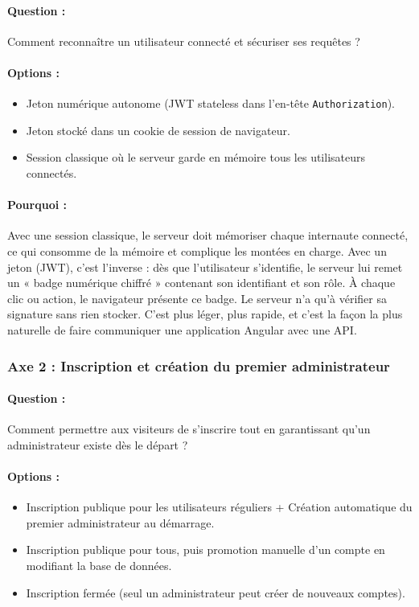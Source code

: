 \documentclass[11pt,a4paper]{article}
\begin{document}
\paragraph{Question :} Comment reconnaître un utilisateur connecté et sécuriser ses requêtes ?
\paragraph{Options :}
\begin{itemize}
    \item[$\boxtimes$] Jeton numérique autonome (JWT stateless dans l'en-tête \texttt{Authorization}).
    \item[$\square$] Jeton stocké dans un cookie de session de navigateur.
    \item[$\square$] Session classique où le serveur garde en mémoire tous les utilisateurs connectés.
\end{itemize}
\paragraph{Pourquoi :} Avec une session classique, le serveur doit mémoriser chaque internaute connecté, ce qui consomme de la mémoire et complique les montées en charge. Avec un jeton (JWT), c'est l'inverse : dès que l'utilisateur s'identifie, le serveur lui remet un « badge numérique chiffré » contenant son identifiant et son rôle. À chaque clic ou action, le navigateur présente ce badge. Le serveur n'a qu'à vérifier sa signature sans rien stocker. C'est plus léger, plus rapide, et c'est la façon la plus naturelle de faire communiquer une application Angular avec une API.

\subsubsection{Axe 2 : Inscription et création du premier administrateur}
\paragraph{Question :} Comment permettre aux visiteurs de s'inscrire tout en garantissant qu'un administrateur existe dès le départ ?
\paragraph{Options :}
\begin{itemize}
    \item[$\boxtimes$] Inscription publique pour les utilisateurs réguliers + Création automatique du premier administrateur au démarrage.
    \item[$\square$] Inscription publique pour tous, puis promotion manuelle d'un compte en modifiant la base de données.
    \item[$\square$] Inscription fermée (seul un administrateur peut créer de nouveaux comptes).
\end{itemize}
\end{document}
